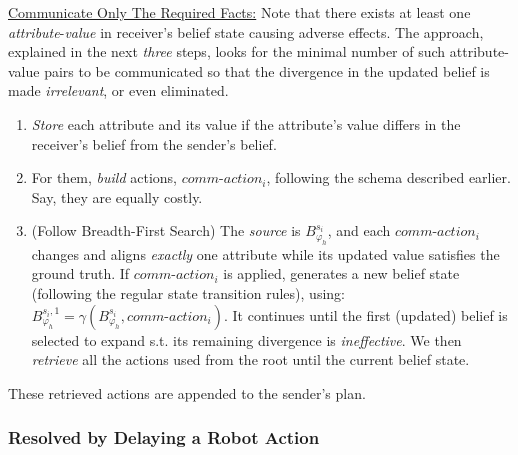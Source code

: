 \documentclass[letterpaper]{article} %
\begin{document}

\underline{Communicate Only The Required Facts:}
Note that there exists at least one \textit{attribute}-\textit{value} in receiver's belief state causing adverse effects. 
The approach, explained in the next \textit{three} steps, looks for the minimal number of such attribute-value pairs to be communicated so that
the divergence in the updated belief is made \textit{irrelevant}, or even eliminated.
\begin{enumerate}
    \item 
    \textit{Store} each attribute and its value if the attribute's value differs in the receiver's belief from the sender's belief. 

    \item For them, \textit{build} actions, $\textit{comm-action}_i$, following the schema described earlier. Say, they are equally costly.  
    
    \item 
    (Follow Breadth-First Search) 
    The \textit{source} is $B_{\varphi_h}^{s_i}$, and each $\textit{comm-action}_i$ changes and aligns \textit{exactly} one attribute while its updated value satisfies the ground truth. If $\textit{comm-action}_i$ is applied, generates a new belief state (following the regular state transition rules), using: $B_{\varphi_h}^{s_i,1} = \gamma(B_{\varphi_h}^{s_i}, \textit{comm-action}_i)$.
    It continues until the first (updated) belief is selected to expand s.t. its remaining divergence is \textit{ineffective}. We then \textit{retrieve} all the actions used from the root until the current belief state.   
\end{enumerate}

These retrieved actions are appended to the sender's plan.

\subsubsection{Resolved by Delaying a Robot Action}
\end{document}
